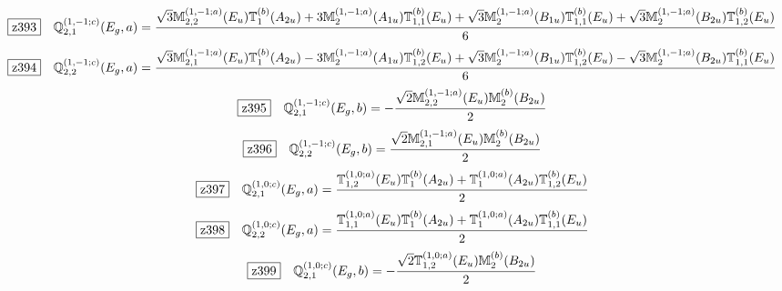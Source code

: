 \documentclass[fleqn,10pt,landscape]{jsarticle}
\begin{document}
\begin{dmath*}
\hspace*{3mm}\fbox{z393}\quad \mathbb{Q}_{2,1}^{(1,-1;c)}(E_{g},a)=\frac{\sqrt{3} \mathbb{M}_{2,2}^{(1,-1;a)}(E_{u}) \mathbb{T}_{1}^{(b)}(A_{2u}) + 3 \mathbb{M}_{2}^{(1,-1;a)}(A_{1u}) \mathbb{T}_{1,1}^{(b)}(E_{u}) + \sqrt{3} \mathbb{M}_{2}^{(1,-1;a)}(B_{1u}) \mathbb{T}_{1,1}^{(b)}(E_{u}) + \sqrt{3} \mathbb{M}_{2}^{(1,-1;a)}(B_{2u}) \mathbb{T}_{1,2}^{(b)}(E_{u})}{6}
\end{dmath*}
\begin{dmath*}
\hspace*{3mm}\fbox{z394}\quad \mathbb{Q}_{2,2}^{(1,-1;c)}(E_{g},a)=\frac{\sqrt{3} \mathbb{M}_{2,1}^{(1,-1;a)}(E_{u}) \mathbb{T}_{1}^{(b)}(A_{2u}) - 3 \mathbb{M}_{2}^{(1,-1;a)}(A_{1u}) \mathbb{T}_{1,2}^{(b)}(E_{u}) + \sqrt{3} \mathbb{M}_{2}^{(1,-1;a)}(B_{1u}) \mathbb{T}_{1,2}^{(b)}(E_{u}) - \sqrt{3} \mathbb{M}_{2}^{(1,-1;a)}(B_{2u}) \mathbb{T}_{1,1}^{(b)}(E_{u})}{6}
\end{dmath*}
\begin{dmath*}
\hspace*{3mm}\fbox{z395}\quad \mathbb{Q}_{2,1}^{(1,-1;c)}(E_{g},b)=- \frac{\sqrt{2} \mathbb{M}_{2,2}^{(1,-1;a)}(E_{u}) \mathbb{M}_{2}^{(b)}(B_{2u})}{2}
\end{dmath*}
\begin{dmath*}
\hspace*{3mm}\fbox{z396}\quad \mathbb{Q}_{2,2}^{(1,-1;c)}(E_{g},b)=\frac{\sqrt{2} \mathbb{M}_{2,1}^{(1,-1;a)}(E_{u}) \mathbb{M}_{2}^{(b)}(B_{2u})}{2}
\end{dmath*}
\begin{dmath*}
\hspace*{3mm}\fbox{z397}\quad \mathbb{Q}_{2,1}^{(1,0;c)}(E_{g},a)=\frac{\mathbb{T}_{1,2}^{(1,0;a)}(E_{u}) \mathbb{T}_{1}^{(b)}(A_{2u}) + \mathbb{T}_{1}^{(1,0;a)}(A_{2u}) \mathbb{T}_{1,2}^{(b)}(E_{u})}{2}
\end{dmath*}
\begin{dmath*}
\hspace*{3mm}\fbox{z398}\quad \mathbb{Q}_{2,2}^{(1,0;c)}(E_{g},a)=\frac{\mathbb{T}_{1,1}^{(1,0;a)}(E_{u}) \mathbb{T}_{1}^{(b)}(A_{2u}) + \mathbb{T}_{1}^{(1,0;a)}(A_{2u}) \mathbb{T}_{1,1}^{(b)}(E_{u})}{2}
\end{dmath*}
\begin{dmath*}
\hspace*{3mm}\fbox{z399}\quad \mathbb{Q}_{2,1}^{(1,0;c)}(E_{g},b)=- \frac{\sqrt{2} \mathbb{T}_{1,2}^{(1,0;a)}(E_{u}) \mathbb{M}_{2}^{(b)}(B_{2u})}{2}
\end{dmath*}
\end{document}
